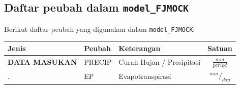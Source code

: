\documentclass[11pt]{article}
\begin{document}
    \hypertarget{daftar-peubah-dalam-model_fjmock}{%
\subsection{\texorpdfstring{Daftar peubah dalam
\texttt{model\_FJMOCK}}{Daftar peubah dalam model\_FJMOCK}}\label{daftar-peubah-dalam-model_fjmock}}

Berikut daftar peubah yang digunakan dalam \texttt{model\_FJMOCK}:

\begin{longtable}[]{@{}lllc@{}}
\toprule
\begin{minipage}[b]{0.22\columnwidth}\raggedright
Jenis\strut
\end{minipage} & \begin{minipage}[b]{0.22\columnwidth}\raggedright
Peubah\strut
\end{minipage} & \begin{minipage}[b]{0.22\columnwidth}\raggedright
Keterangan\strut
\end{minipage} & \begin{minipage}[b]{0.22\columnwidth}\centering
Satuan\strut
\end{minipage}\tabularnewline
\midrule
\endhead
\begin{minipage}[t]{0.22\columnwidth}\raggedright
\textbf{DATA MASUKAN}\strut
\end{minipage} & \begin{minipage}[t]{0.22\columnwidth}\raggedright
PRECIP\strut
\end{minipage} & \begin{minipage}[t]{0.22\columnwidth}\raggedright
Curah Hujan / Presipitasi\strut
\end{minipage} & \begin{minipage}[t]{0.22\columnwidth}\centering
\(\frac{mm}{period}\)\strut
\end{minipage}\tabularnewline
\begin{minipage}[t]{0.22\columnwidth}\raggedright
.\strut
\end{minipage} & \begin{minipage}[t]{0.22\columnwidth}\raggedright
EP\strut
\end{minipage} & \begin{minipage}[t]{0.22\columnwidth}\raggedright
Evapotranspirasi\strut
\end{minipage} & \begin{minipage}[t]{0.22\columnwidth}\centering
\(^{mm}/_{day}\)\strut
\end{minipage}\tabularnewline

\end{longtable}
\end{document}
